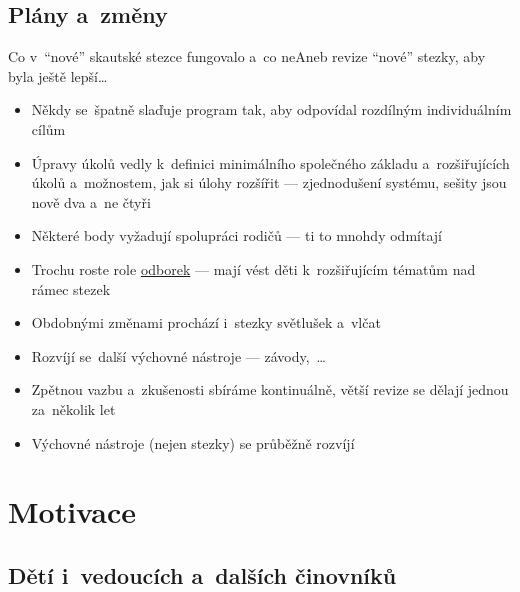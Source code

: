 \documentclass[compress, xelatex, 11pt, xcolor=dvipsnames, aspectratio=169, url={hyphens, lowtilde}]{beamer}
\begin{document}
\subsection{Plány a~změny}

\begin{frame}{Co v~\enquote{nové} skautské stezce fungovalo a~co ne}{Aneb revize \enquote{nové} stezky, aby byla ještě lepší\ldots}
	\begin{itemize}
		\item Někdy se~špatně slaďuje program tak, aby odpovídal rozdílným individuálním cílům
		\item Úpravy úkolů vedly k~definici minimálního společného základu a~rozšiřujících úkolů a~možnostem, jak si úlohy rozšířit --- zjednodušení systému, sešity jsou nově dva a~ne čtyři
		\item Některé body vyžadují spolupráci rodičů --- ti to mnohdy odmítají
		\item Trochu roste role \href{https://odborky.skaut.cz/}{odborek} --- mají vést děti k~rozšiřujícím tématům nad rámec stezek
		\item Obdobnými změnami prochází i~stezky světlušek a~vlčat
		\item Rozvíjí se~další výchovné nástroje --- závody,~\ldots
		\item Zpětnou vazbu a~zkušenosti sbíráme kontinuálně, větší revize se dělají jednou za~několik let
		\item Výchovné nástroje (nejen stezky) se průběžně rozvíjí
	\end{itemize}
\end{frame}

\section{Motivace}

\subsection{Dětí i~vedoucích a~dalších činovníků}
\end{document}
